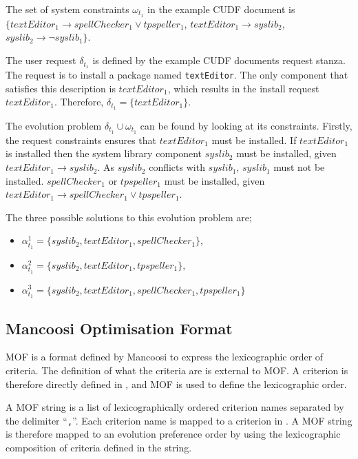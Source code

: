 The set of system constraints $\omega_{t_1}$ in the example CUDF document is
$\{ textEditor_1 \rightarrow spellChecker_1 \vee tpspeller_1$,
$textEditor_1 \rightarrow syslib_2$, 
$syslib_2 \rightarrow \neg syslib_1\}$.


The user request $\delta_{t_1}$ is defined by the example CUDF documents request stanza.
The request is to install a package named \texttt{textEditor}.
The only component that satisfies this description is $textEditor_1$, which results in the install request $textEditor_1$.
Therefore, $\delta_{t_1} = \{textEditor_1\}$.

The evolution problem $\delta_{t_1} \cup \omega_{t_1}$ can be found by looking at its constraints.
Firstly, the request constraints ensures that $textEditor_1$ must be installed.
If $textEditor_1$ is installed then the system library component $syslib_2$ must be installed, given $textEditor_1 \rightarrow syslib_2$.
As $syslib_2$ conflicts with $syslib_1$, $syslib_1$ must not be installed.
$spellChecker_1$ or $tpspeller_1$ must be installed, given $textEditor_1 \rightarrow spellChecker_1 \vee tpspeller_1$.

The three possible solutions to this evolution problem are;
\begin{itemize}
  \item $\alpha_{t_1}^1 = \{syslib_2, textEditor_1, spellChecker_1\}$,
  \item $\alpha_{t_1}^2 = \{syslib_2, textEditor_1, tpspeller_1\}$,
  \item $\alpha_{t_1}^3 = \{syslib_2, textEditor_1, spellChecker_1, tpspeller_1\}$
\end{itemize}

\subsection{Mancoosi Optimisation Format}
\label{formal.mancoosioptimisationformat}
MOF is a format defined by Mancoosi to express the lexicographic order of criteria.
The definition of what the criteria are is external to MOF.
A criterion is therefore directly defined in \modelname, and MOF is used to define the lexicographic order. 

A MOF string is a list of lexicographically ordered criterion names separated by the delimiter ``\texttt{,}''.
Each criterion name is mapped to a criterion in \modelname.
A MOF string is therefore mapped to an evolution preference order by using the lexicographic composition of criteria defined in the string.

